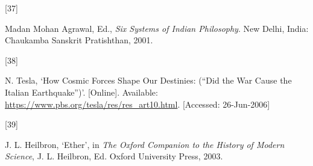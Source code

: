 \documentclass[
  a4paper,
]{article}
\newlength{\cslhangindent}
\newlength{\csllabelwidth}
\newlength{\cslentryspacingunit} %
\newenvironment{CSLReferences}[2] %
 {%
  \setlength{\parindent}{0pt}
  \ifodd #1
  \let\oldpar\par
  \def\par{\hangindent=\cslhangindent\oldpar}
  \fi
  \setlength{\parskip}{#2\cslentryspacingunit}
 }%
 {}
\newcommand{\CSLLeftMargin}[1]{\parbox[t]{\csllabelwidth}{#1}}
\newcommand{\CSLRightInline}[1]{\parbox[t]{\linewidth - \csllabelwidth}{#1}\break}
\begin{document}
\begin{CSLReferences}{0}{0}
\leavevmode{}%
\CSLLeftMargin{{[}37{]} }
\CSLRightInline{Madan Mohan Agrawal, Ed., \emph{{Six Systems of Indian
Philosophy}}. New Delhi, India: Chaukamba Sanskrit Pratishthan, 2001. }

\leavevmode{}%
\CSLLeftMargin{{[}38{]} }
\CSLRightInline{N. Tesla, {`{How Cosmic Forces Shape Our Destinies:
({``Did the War Cause the Italian Earthquake''})}'}. {[}Online{]}.
Available: \url{https://www.pbs.org/tesla/res/res_art10.html}.
{[}Accessed: 26-Jun-2006{]}}

\leavevmode{}%
\CSLLeftMargin{{[}39{]} }
\CSLRightInline{J. L. Heilbron, {`Ether'}, in \emph{{The Oxford
Companion to the History of Modern Science}}, J. L. Heilbron, Ed. Oxford
University Press, 2003. }

\end{CSLReferences}
\end{document}

